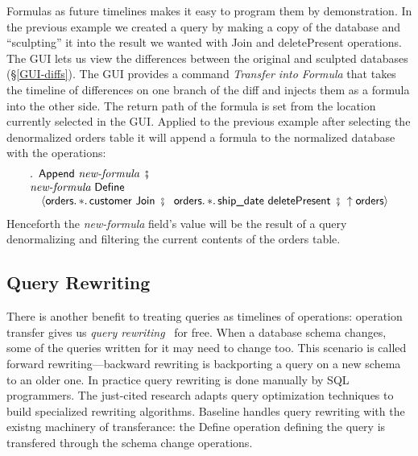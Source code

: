 \documentclass[english,submission]{programming}
\theoremstyle{definition}
\DeclareMathOperator{\exec}{\ \fatsemi\ \ }
\begin{document}
Formulas as future timelines makes it easy to program them by demonstration. In the previous example we created a query by making a copy of the database and ``sculpting'' it into the result we wanted with \textsf{Join} and \textsf{deletePresent} operations. The GUI lets us view the differences between the original and sculpted databases (\S\ref{GUI-diffs}). The GUI provides a command \textit{Transfer into Formula} that takes the timeline of differences on one branch of the diff and injects them as a formula into the other side. The return path of the formula is set from the location currently selected in the GUI. Applied to the previous example after selecting the denormalized \textsf{orders} table it will append a formula to the normalized database with the operations:
\[
\begin{array}{l}
  \ldotp \textsf{ Append } \textit{new-formula} \exec\\
  \textit{new-formula} \textsf{ Define } \\
  \quad \langle
\textsf{orders}\ldotp * \ldotp \textsf{customer Join} \exec
\textsf{orders}\ldotp * \ldotp \textsf{ship\_date deletePresent} \exec
\!\!\uparrow \textsf{orders}
  \rangle\\
\end{array}
\]
Henceforth the \textit{new-formula} field's value will be the result of a query  denormalizing and filtering the current contents of the orders table.






\subsection{Query Rewriting}

There is another benefit to treating queries as timelines of operations: operation transfer gives us \textit{query rewriting}~\cite{curino08, herrmann17} for free. When a database schema changes, some of the queries written for it may need to change too. This scenario is called forward rewriting---backward rewriting is backporting a query on a new schema to an older one.
In practice query rewriting is done manually by SQL programmers. The just-cited research adapts query optimization techniques to build specialized rewriting algorithms.
Baseline handles query rewriting with the existng machinery of transferance: the \textsf{Define} operation defining the query is transfered through the schema change operations.
\end{document}
